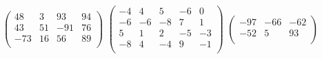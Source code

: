  $\left(
\begin{array}{cccc}
48 & 3 & 93 & 94\\
43 & 51 & -91 & 76\\
-73 & 16 & 56 & 89\\
\end{array}
\right)
$ 
\vfill
 $\left(
\begin{array}{cccc|c}
-4 & 4 & 5 & -6 & 0\\
-6 & -6 & -8 & 7 & 1\\
5 & 1 & 2 & -5 & -3\\
-8 & 4 & -4 & 9 & -1\\
\end{array}
\right)
$ 
\hspace{\fill}
 $\left(
\begin{array}{cc|c}
-97 & -66 & -62\\
-52 & 5 & 93\\
\end{array}
\right)
$ 
\hspace{\fill}
\newpage
